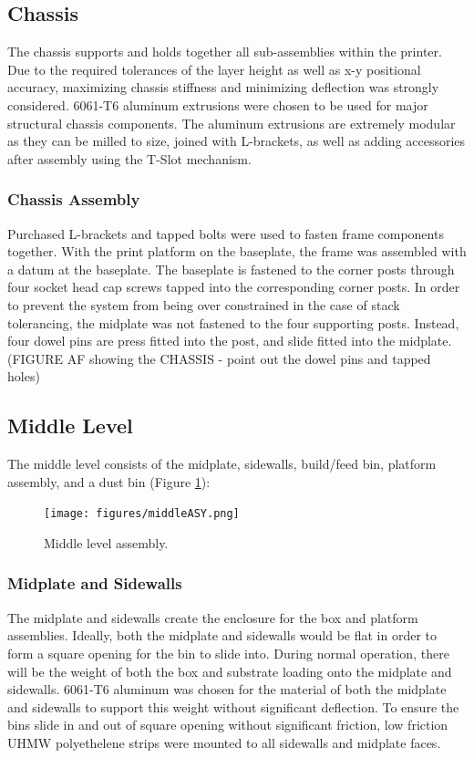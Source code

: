 \documentclass[11pt]{article}
\begin{document}
\subsection{Chassis}
The chassis supports and holds together all sub-assemblies within the printer. Due to the required tolerances of the layer height as well as x-y positional accuracy, maximizing chassis stiffness and minimizing deflection was strongly considered. 6061-T6 aluminum extrusions were chosen to be used for major structural chassis components. The aluminum extrusions are extremely modular as they can be milled to size, joined with L-brackets, as well as adding accessories after assembly using the T-Slot mechanism.

\subsubsection{Chassis Assembly}
Purchased L-brackets and tapped bolts were used to fasten frame components together. With the print platform on the baseplate, the frame was assembled with a datum at the baseplate. The baseplate is fastened to the corner posts through four socket head cap screws tapped into the corresponding corner posts. In order to prevent the system from being over constrained in the case of stack tolerancing, the midplate was not fastened to the four supporting posts. Instead, four dowel pins are press fitted into the post, and slide fitted into the midplate. (FIGURE AF showing the CHASSIS - point out the dowel pins and tapped holes)

\subsection{Middle Level}
The middle level consists of the midplate, sidewalls, build/feed bin, platform assembly, and a dust bin (Figure \ref{midLevelASY}):

\begin{figure}[htp]
\centering
\texttt{[image: figures/middleASY.png]}
\caption{Middle level assembly.}
\label{midLevelASY}
\end{figure}

\subsubsection {Midplate and Sidewalls}
The midplate and sidewalls create the enclosure for the box and platform assemblies. Ideally, both the midplate and sidewalls would be flat in order to form a square opening for the bin to slide into. During normal operation, there will be the weight of both the box and substrate loading onto the midplate and sidewalls. 6061-T6 aluminum was chosen for the material of both the midplate and sidewalls to support this weight without significant deflection. To ensure the bins slide in and out of square opening without significant friction, low friction UHMW polyethelene strips were mounted to all sidewalls and midplate faces. 
\end{document}

